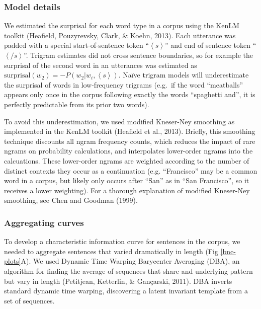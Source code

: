 \documentclass[man,floatsintext]{apa6}
\begin{document}
\hypertarget{model-details}{%
\subsubsection{Model details}\label{model-details}}

We estimated the surprisal for each word type in a corpus using the KenLM toolkit (Heafield, Pouzyrevsky, Clark, \& Koehn, 2013). Each utterance was padded with a special start-of-sentence token \enquote{\(\left<s\right>\)} and end of sentence token \enquote{\(\left</s\right>\)}. Trigram estimates did not cross sentence boundaries, so for example the surprisal of the second word in an utterances was estimated as \(\text{surprisal}(w_{2}) = -P(w_2|w_{i},\left<s\right>)\). Naïve trigram models will underestimate the surprisal of words in low-frequency trigrams (e.g.~if the word \enquote{meatballs} appears only once in the corpus following exactly the words \enquote{spaghetti and}, it is perfectly predictable from its prior two words).

To avoid this underestimation, we used modified Kneser-Ney smoothing as implemented in the KenLM toolkit (Heafield et al., 2013). Briefly, this smoothing technique discounts all ngram frequency counts, which reduces the impact of rare ngrams on probability calculations, and interpolates lower-order ngrams into the calcuations. These lower-order ngrams are weighted according to the number of distinct contexts they occur as a continuation (e.g. \enquote{Francisco} may be a common word in a corpus, but likely only occurs after \enquote{San} as in \enquote{San Francisco}, so it receives a lower weighting). For a thorough explanation of modified Kneser-Ney smoothing, see Chen and Goodman (1999).

\hypertarget{aggregating-curves}{%
\subsubsection{Aggregating curves}\label{aggregating-curves}}

To develop a characteristic information curve for sentences in the corpus, we needed to aggregate sentences that varied dramatically in length (Fig \ref{bnc-plots}A). We used Dynamic Time Warping Barycenter Averaging (DBA), an algorithm for finding the average of sequences that share and underlying pattern but vary in length (Petitjean, Ketterlin, \& Gançarski, 2011). DBA inverts standard dynamic time warping, discovering a latent invariant template from a set of sequences.
\end{document}

